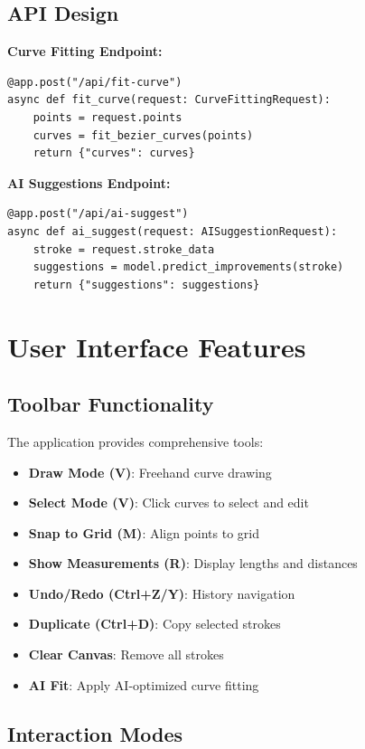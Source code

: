 \documentclass[12pt,a4paper]{article}
\begin{document}
\subsection{API Design}

\textbf{Curve Fitting Endpoint:}
\begin{verbatim}
@app.post("/api/fit-curve")
async def fit_curve(request: CurveFittingRequest):
    points = request.points
    curves = fit_bezier_curves(points)
    return {"curves": curves}
\end{verbatim}

\textbf{AI Suggestions Endpoint:}
\begin{verbatim}
@app.post("/api/ai-suggest")
async def ai_suggest(request: AISuggestionRequest):
    stroke = request.stroke_data
    suggestions = model.predict_improvements(stroke)
    return {"suggestions": suggestions}
\end{verbatim}

\section{User Interface Features}

\subsection{Toolbar Functionality}

The application provides comprehensive tools:

\begin{itemize}
    \item \textbf{Draw Mode (V)}: Freehand curve drawing
    \item \textbf{Select Mode (V)}: Click curves to select and edit
    \item \textbf{Snap to Grid (M)}: Align points to grid
    \item \textbf{Show Measurements (R)}: Display lengths and distances
    \item \textbf{Undo/Redo (Ctrl+Z/Y)}: History navigation
    \item \textbf{Duplicate (Ctrl+D)}: Copy selected strokes
    \item \textbf{Clear Canvas}: Remove all strokes
    \item \textbf{AI Fit}: Apply AI-optimized curve fitting
\end{itemize}

\subsection{Interaction Modes}
\end{document}
